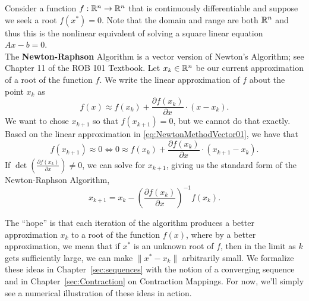 Consider a function $f:\mathbb R^n \to \mathbb R^n$ that is continuously differentiable and suppose we seek a root $f(x^\ast)=0$. Note that the domain and range are both $\mathbb R^n$ and thus this is the nonlinear equivalent of solving a square linear equation $Ax-b=0$.\\

The \textbf{Newton-Raphson} Algorithm is a vector version of Newton's Algorithm; see Chapter 11 of the ROB 101 Textbook. Let $x_k \in \mathbb R^n$ be our current approximation of a root of the function $f$. We write the linear approximation of $f$ about the point $x_k$ as
\begin{equation}
    \label{eq:NewtonMethodVector01}
    f(x) \approx f(x_k) + \frac{\partial f(x_k)}{\partial x}\cdot (x - x_k).
\end{equation}
We want to chose $x_{k+1}$ so that $f(x_{k+1})=0$, but we cannot do that exactly. Based on the linear approximation in \eqref{eq:NewtonMethodVector01}, we have that 
\begin{equation}
    \label{eq:BasicNewtonRaphson}
     f(x_{k+1}) \approx 0 \iff  0  \approx f(x_k) + \frac{\partial f(x_k)}{\partial x}\cdot (x_{k+1} - x_k).
\end{equation}
If $\det\left(\frac{\partial f(x_k)}{\partial x} \right)\neq 0$, we can solve for $x_{k+1}$, giving us the standard form of the Newton-Raphson Algorithm, 
$$ \boxed{    x_{k+1}=x_{k} - \left(   \frac{\partial f(x_k)}{\partial x}\right)^{-1} f(x_k).}$$


The ``hope'' is that each iteration of the algorithm produces a better approximation $x_k$ to a root of the function $f(x)$, where by a better approximation, we mean that if $x^\ast$ is an unknown root of $f$, then in the limit as $k$ gets sufficiently large, we can make $\|x^\ast - x_k\|$ arbitrarily small. We formalize these ideas in Chapter~\ref{sec:sequences} with the notion of a converging sequence and in Chapter~\ref{sec:Contraction} on Contraction Mappings. For now, we'll simply see a numerical illustration of these ideas in action.

